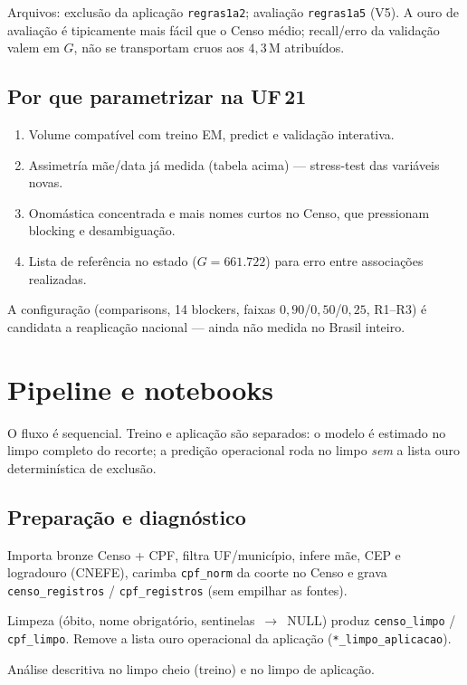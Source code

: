 \documentclass[11pt,a4paper]{article}
\begin{document}
Arquivos: exclusão da aplicação \texttt{regras1a2}; avaliação
\texttt{regras1a5} (V5). A ouro de avaliação é tipicamente mais fácil que o
Censo médio; recall/erro da validação valem em $G$, não se transportam cruos
aos $4{,}3$\,M atribuídos.

\subsection{Por que parametrizar na UF\,21}

\begin{enumerate}
  \item Volume compatível com treino EM, predict e validação interativa.
  \item Assimetría mãe/data já medida (tabela acima) --- stress-test das
        variáveis novas.
  \item Onomástica concentrada e mais nomes curtos no Censo, que pressionam
        blocking e desambiguação.
  \item Lista de referência no estado ($G=661{.}722$) para erro entre
        associações realizadas.
\end{enumerate}

A configuração (comparisons, 14 blockers, faixas $0{,}90$/$0{,}50$/$0{,}25$,
R1--R3) é candidata a reaplicação nacional --- ainda não medida no Brasil
inteiro.

\section{Pipeline e notebooks}

O fluxo é sequencial. Treino e aplicação são separados: o modelo é estimado no
limpo completo do recorte; a predição operacional roda no limpo \emph{sem} a
lista ouro determinística de exclusão.

\subsection{Preparação e diagnóstico}

\begin{description}[style=nextline]
  \item[\texttt{00\_preparar\_bases}]
    Importa bronze Censo + CPF, filtra UF/município, infere mãe, CEP e
    logradouro (CNEFE), carimba \texttt{cpf\_norm} da coorte no Censo e grava
    \texttt{censo\_registros} / \texttt{cpf\_registros} (sem empilhar as
    fontes).
  \item[\texttt{00b\_limpar\_dados}]
    Limpeza (óbito, nome obrigatório, sentinelas~$\to$~NULL) produz
    \texttt{censo\_limpo} / \texttt{cpf\_limpo}. Remove a lista ouro
    operacional da aplicação
    (\texttt{*\_limpo\_aplicacao}).
  \item[\texttt{01} / \texttt{01b}]
    Análise descritiva no limpo cheio (treino) e no limpo de aplicação.
\end{description}
\end{document}
